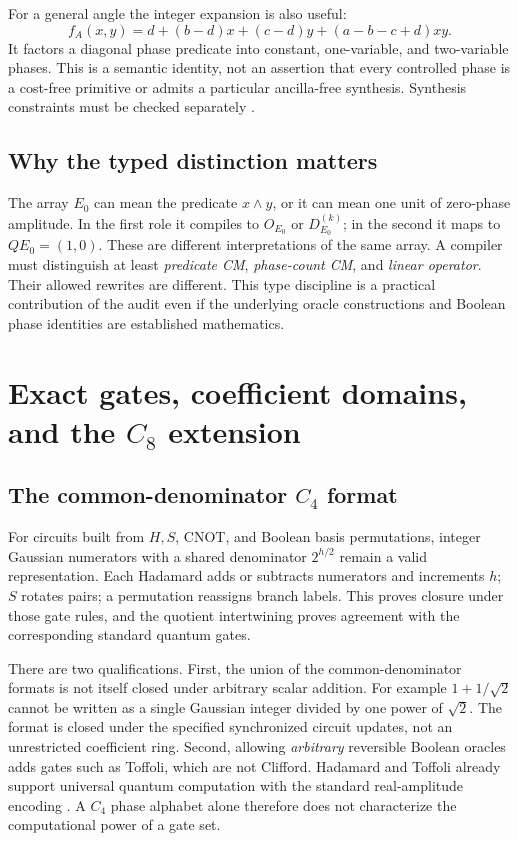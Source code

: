 For a general angle the integer expansion is also useful:
\begin{equation}
 f_A(x,y)=d+(b-d)x+(c-d)y+(a-b-c+d)xy.
\end{equation}
It factors a diagonal phase predicate into constant, one-variable, and two-variable phases. This is a semantic identity, not an assertion that every controlled phase is a cost-free primitive or admits a particular ancilla-free synthesis. Synthesis constraints must be checked separately \cite{giles,kmm}.

\subsection{Why the typed distinction matters}
The array $E_0$ can mean the predicate $x\land y$, or it can mean one unit of zero-phase amplitude. In the first role it compiles to $O_{E_0}$ or $D_{E_0}^{(k)}$; in the second it maps to $QE_0=(1,0)$. These are different interpretations of the same array. A compiler must distinguish at least \emph{predicate CM}, \emph{phase-count CM}, and \emph{linear operator}. Their allowed rewrites are different. This type discipline is a practical contribution of the audit even if the underlying oracle constructions and Boolean phase identities are established mathematics.

\section{Exact gates, coefficient domains, and the \texorpdfstring{$C_8$}{C8} extension}\label{sec:exact}
\subsection{The common-denominator \texorpdfstring{$C_4$}{C4} format}
For circuits built from $H,S$, CNOT, and Boolean basis permutations, integer Gaussian numerators with a shared denominator $2^{h/2}$ remain a valid representation. Each Hadamard adds or subtracts numerators and increments $h$; $S$ rotates pairs; a permutation reassigns branch labels. This proves closure under those gate rules, and the quotient intertwining proves agreement with the corresponding standard quantum gates.

There are two qualifications. First, the union of the common-denominator formats is not itself closed under arbitrary scalar addition. For example $1+1/\sqrt2$ cannot be written as a single Gaussian integer divided by one power of $\sqrt2$. The format is closed under the specified synchronized circuit updates, not an unrestricted coefficient ring. Second, allowing \emph{arbitrary} reversible Boolean oracles adds gates such as Toffoli, which are not Clifford. Hadamard and Toffoli already support universal quantum computation with the standard real-amplitude encoding \cite{aharonov}. A $C_4$ phase alphabet alone therefore does not characterize the computational power of a gate set.

